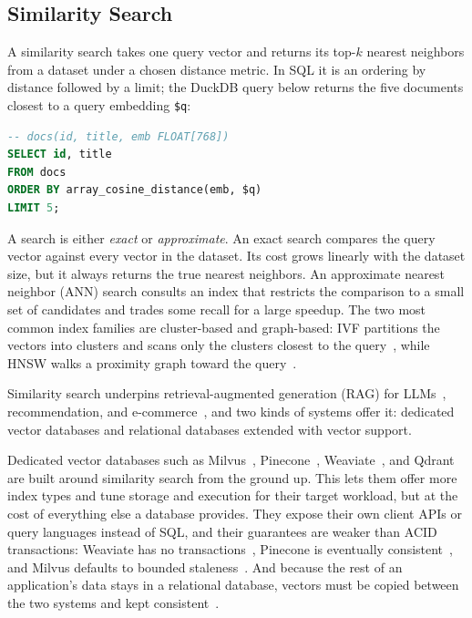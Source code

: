 \subsection{Similarity Search}\label{subsec:vector-search}

A similarity search takes one query vector and returns its top-$k$ nearest neighbors from a dataset under a chosen distance metric.
In SQL it is an ordering by distance followed by a limit; the DuckDB query below returns the five documents closest to a query embedding \texttt{\$q}:

\begin{lstlisting}[language=SQL, basicstyle=\ttfamily\small, frame=none]
-- docs(id, title, emb FLOAT[768])
SELECT id, title
FROM docs
ORDER BY array_cosine_distance(emb, $q)
LIMIT 5;
\end{lstlisting}

A search is either \textit{exact} or \textit{approximate}.
An exact search compares the query vector against every vector in the dataset.
Its cost grows linearly with the dataset size, but it always returns the true nearest neighbors.
An approximate nearest neighbor (ANN) search consults an index that restricts the comparison to a small set of candidates and trades some recall for a large speedup.
The two most common index families are cluster-based and graph-based: IVF partitions the vectors into clusters and scans only the clusters closest to the query~\cite{JegouPQ11}, while HNSW walks a proximity graph toward the query~\cite{MalkovYashunin20}.

Similarity search underpins retrieval-augmented generation (RAG) for LLMs~\cite{LewisRAG20}, recommendation, and e-commerce~\cite{PanWangLi24, WangMilvus21}, and two kinds of systems offer it: dedicated vector databases and relational databases extended with vector support.

Dedicated vector databases such as Milvus~\cite{WangMilvus21}, Pinecone~\cite{PineconeDocs}, Weaviate~\cite{WeaviateDocs}, and Qdrant~\cite{QdrantDocs} are built around similarity search from the ground up.
This lets them offer more index types and tune storage and execution for their target workload, but at the cost of everything else a database provides.
They expose their own client APIs or query languages instead of SQL, and their guarantees are weaker than ACID transactions: Weaviate has no transactions~\cite{WeaviateFAQ}, Pinecone is eventually consistent~\cite{PineconeFreshness}, and Milvus defaults to bounded staleness~\cite{MilvusConsistency}.
And because the rest of an application's data stays in a relational database, vectors must be copied between the two systems and kept consistent~\cite{ChenSingleStoreV24}.

